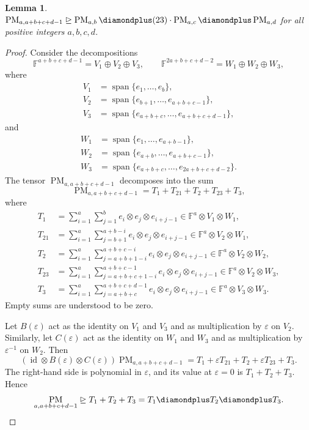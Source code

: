 \documentclass[11pt,letterpaper]{article}
\newtheorem{lemma}[theorem]{Lemma}\AddToHook{env/lemma/begin}{\crefalias{theorem}{lemma}}
\numberwithin{equation}{section}
\newcommand{\FF}{\mathbb{F}}
\DeclareMathOperator{\PM}{PM}
\begin{document}
\begin{lemma}\label{lem:pm-tripling-degeneration}
  $\PM_{a, a + b + c + d - 1} \trianglerighteq \PM_{a, b} \diamondplus (23)\cdot \PM_{a, c} \diamondplus \PM_{a, d}$ for all positive integers $a, b, c, d$.
\end{lemma}
\begin{proof}
Consider the decompositions
\[
\FF^{a+b+c+d-1}=V_1\oplus V_2\oplus V_3,
\qquad
\FF^{2a+b+c+d-2}=W_1\oplus W_2\oplus W_3,
\]
where
\begin{align*}
V_1&=\operatorname{span}\{e_1,\ldots,e_b\},\\
V_2&=\operatorname{span}\{e_{b+1},\ldots,e_{a+b+c-1}\},\\
V_3&=\operatorname{span}\{e_{a+b+c},\ldots,e_{a+b+c+d-1}\},
\end{align*}
and
\begin{align*}
W_1&=\operatorname{span}\{e_1,\ldots,e_{a+b-1}\},\\
W_2&=\operatorname{span}\{e_{a+b},\ldots,e_{a+b+c-1}\},\\
W_3&=\operatorname{span}\{e_{a+b+c},\ldots,e_{2a+b+c+d-2}\}.
\end{align*}
The tensor $\PM_{a,a+b+c+d-1}$ decomposes into the sum
\[
\PM_{a,a+b+c+d-1}
=T_1+T_{21}+T_2+T_{23}+T_3,
\]
where
\begin{align*}
T_1
&=\sum_{i=1}^{a}\sum_{j=1}^{b}
e_i\otimes e_j\otimes e_{i+j-1}
\in \FF^a\otimes V_1\otimes W_1,\\
T_{21}
&=\sum_{i=1}^{a}\sum_{j=b+1}^{a+b-i}
e_i\otimes e_j\otimes e_{i+j-1}
\in \FF^a\otimes V_2\otimes W_1,\\
T_2
&=\sum_{i=1}^{a}\sum_{j=a+b+1-i}^{a+b+c-i}
e_i\otimes e_j\otimes e_{i+j-1}
\in \FF^a\otimes V_2\otimes W_2,\\
T_{23}
&=\sum_{i=1}^{a}\sum_{j=a+b+c+1-i}^{a+b+c-1}
e_i\otimes e_j\otimes e_{i+j-1}
\in \FF^a\otimes V_2\otimes W_3,\\
T_3
&=\sum_{i=1}^{a}\sum_{j=a+b+c}^{a+b+c+d-1}
e_i\otimes e_j\otimes e_{i+j-1}
\in \FF^a\otimes V_3\otimes W_3.
\end{align*}
Empty sums are understood to be zero.

Let $B(\varepsilon)$ act as the identity on $V_1$ and $V_3$
and as multiplication by $\varepsilon$ on $V_2$.
Similarly, let $C(\varepsilon)$ act as the identity on $W_1$
and $W_3$ and as multiplication by $\varepsilon^{-1}$ on $W_2$.
Then
\[
(\operatorname{id}\otimes B(\varepsilon)\otimes C(\varepsilon))
\PM_{a,a+b+c+d-1}
=
T_1+\varepsilon T_{21}+T_2+\varepsilon T_{23}+T_3.
\]
The right-hand side is polynomial in $\varepsilon$, and its
value at $\varepsilon=0$ is $T_1+T_2+T_3$. Hence
\[
\PM_{a,a+b+c+d-1}
\trianglerighteq T_1+T_2+T_3
=T_1\diamondplus T_2\diamondplus T_3.
\]


\end{proof}
\end{document}
